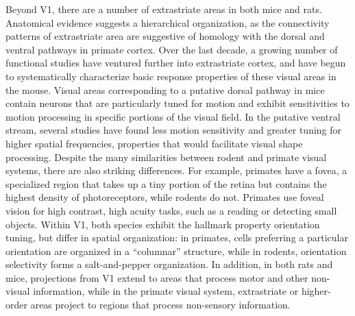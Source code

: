 Beyond V1, there are a number of extrastriate areas in both mice\cite{Andermann2011, Marshel2011, Juavinett2017} and rats\cite{Espinoza1983RetinotopicRat, Coogan1993}. Anatomical evidence suggests a hierarchical organization\cite{Wang2007, Wang2011GatewaysCortex}, as the connectivity patterns of extrastriate area are suggestive of homology with the dorsal and ventral pathways in primate cortex. Over the last decade, a growing number of functional studies have ventured further into extrastriate cortex, and have begun to systematically characterize basic response properties of these visual areas in the mouse\cite{Andermann2011, Marshel2011, Glickfeld2013, Glickfeld2017, DeVries2019, Siegle2021}. Visual areas corresponding to a putative dorsal pathway in mice contain neurons that are particularly tuned for motion\cite{Andermann2011, Marshel2011, Glickfeld2013} and exhibit sensitivities to motion processing in specific portions of the visual field\cite{Sit2020}. In the putative ventral stream, several studies have found less motion sensitivity and greater tuning for higher spatial frequencies\cite{Glickfeld2013, Tohmi2014}, properties that would facilitate visual shape processing. 
% 
Despite the many similarities between rodent and primate visual systems, there are also striking differences. For example, primates have a fovea, a specialized region that takes up a tiny portion of the retina but contains the highest density of photoreceptors\cite{Perry1985}, while rodents do not. Primates use foveal vision for high contrast, high acuity tasks, such as a reading or detecting small objects. Within V1, both species exhibit the hallmark property orientation tuning, but differ in spatial organization: in primates, cells preferring a particular orientation are organized in a ``columnar'' structure\cite{Blasdel1986}, while in rodents, orientation selectivity forms a salt-and-pepper organization\cite{Ohki2005}. In addition, in both rats and mice, projections from V1 extend to areas that process motor and other non-visual information\cite{Wagor1980RetinotopicMouse, Chen1994, Brecht2004}, while in the primate visual system, extrastriate or higher-order areas project to regions that process non-sensory information. 

